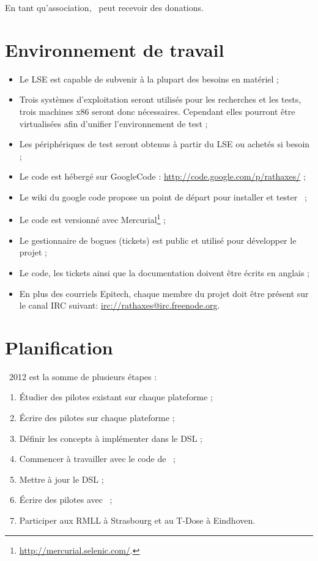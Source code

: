 \documentclass{rtxreport}
\begin{document}
En tant qu'association, \rtx\ peut recevoir des donations.

\section{Environnement de travail}

\begin{itemize}
\item Le LSE est capable de subvenir à la plupart des besoins en matériel ;
\item Trois systèmes d'exploitation seront utilisés pour les recherches et les
tests, trois machines x86 seront donc nécessaires. Cependant elles pourront
être virtualisées afin d'unifier l'environnement de test ;
\item Les périphériques de test seront obtenus à partir du LSE ou achetés si
besoin ;
\item Le code est hébergé sur GoogleCode : \url{http://code.google.com/p/rathaxes/} ;
\item Le wiki du google code propose un point de départ pour installer et
tester \rtx\ ;
\item Le code est versionné avec
Mercurial\footnote{\url{http://mercurial.selenic.com/}.} ;
\item Le gestionnaire de bogues (tickets) est public et utilisé pour développer
le projet ;
\item Le code, les tickets ainsi que la documentation doivent être écrits en
anglais ;
\item En plus des courriels Epitech, chaque membre du projet doit être présent
sur le canal IRC suivant: \url{irc://rathaxes@irc.freenode.org}.
\end{itemize}

\section{Planification}

\rtx\ 2012 est la somme de plusieurs étapes :

\begin{enumerate}
\item Étudier des pilotes existant sur chaque plateforme ;
\item Écrire des pilotes sur chaque plateforme ;
\item Définir les concepts à implémenter dans le DSL ;
\item Commencer à travailler avec le code de \rtx\ ;
\item Mettre à jour le DSL ;
\item Écrire des pilotes avec \rtx\ ;
\item Participer aux RMLL à Strasbourg et au T-Dose à Eindhoven.
\end{enumerate}
\end{document}
